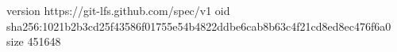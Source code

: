 version https://git-lfs.github.com/spec/v1
oid sha256:1021b2b3cd25f43586f01755e54b4822ddbe6cab8b63c4f21cd8ed8ec476f6a0
size 451648
